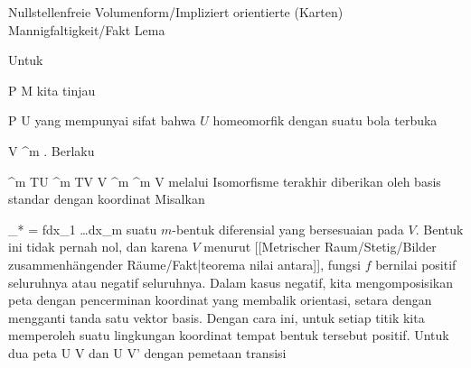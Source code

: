 {Nullstellenfreie Volumenform/Impliziert orientierte (Karten) Mannigfaltigkeit/Fakt}
{Lema}
{}
{

\faktzusatz {}

}
{

Untuk

\mavergleichskette
{\vergleichskette
{ P
}
{ \in }{ M
}
{  }{
}
{    }{
}
{   }{
}
}
{}{}{}
kita tinjau

\mavergleichskette
{\vergleichskette
{ P
}
{ \in }{ U
}
{  }{
}
{    }{
}
{   }{
}
}
{}{}{}
yang mempunyai sifat bahwa $U$ homeomorfik dengan suatu bola terbuka

\mavergleichskette
{\vergleichskette
{ V
}
{ \subseteq }{ \R^m
}
{  }{
}
{    }{
}
{   }{
}
}
{}{}{.}
Berlaku

\mavergleichskettedisp
{\vergleichskette
{ \bigwedge^m TU
}
{ \cong} { \bigwedge^m TV
}
{ \cong} { V \times \bigwedge^m \R^m
}
{ \cong} { V \times \R
}
{ } {
}
}
{}{}{}
melalui
 Isomorfisme terakhir diberikan oleh basis standar dengan koordinat
 Misalkan

\mavergleichskette
{\vergleichskette
{ \alpha_* \omega
}
{ = }{ fdx_1 \wedge \ldots \wedge dx_m
}
{  }{
}
{    }{
}
{   }{
}
}
{}{}{}
suatu $m$-bentuk diferensial yang bersesuaian pada $V$. Bentuk ini tidak pernah nol, dan karena $V$
menurut
[[Metrischer Raum/Stetig/Bilder zusammenhängender Räume/Fakt|teorema nilai antara]],
fungsi $f$ bernilai positif seluruhnya atau negatif seluruhnya. Dalam kasus negatif, kita mengomposisikan peta dengan pencerminan koordinat yang membalik orientasi, setara dengan mengganti tanda satu vektor basis. Dengan cara ini, untuk setiap titik kita memperoleh suatu lingkungan koordinat tempat bentuk tersebut positif. Untuk dua peta
\maabb {\alpha} { U } { V
} {}
dan
\maabb {\beta} { U } { V'
} {}
dengan pemetaan transisi

}
